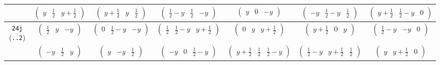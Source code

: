 \documentclass[fleqn,9pt,landscape]{jsarticle}
\begin{document}
\begin{center}
\begin{longtable}{ccccccc}
& $ \begin{pmatrix} y & \frac{1}{2} & y + \frac{1}{2} \end{pmatrix} $ & $ \begin{pmatrix} y + \frac{1}{2} & y & \frac{1}{2} \end{pmatrix} $ & $ \begin{pmatrix} \frac{1}{2} - y & \frac{1}{2} & - y \end{pmatrix} $ & $ \begin{pmatrix} y & 0 & - y \end{pmatrix} $ & $ \begin{pmatrix} - y & \frac{1}{2} - y & \frac{1}{2} \end{pmatrix} $ & $ \begin{pmatrix} y + \frac{1}{2} & \frac{1}{2} - y & 0 \end{pmatrix} $ \\ \hline
{\tt 24j} ({\tt ..2}) & $ \begin{pmatrix} \frac{1}{2} & y & - y \end{pmatrix} $ & $ \begin{pmatrix} 0 & \frac{1}{2} - y & - y \end{pmatrix} $ & $ \begin{pmatrix} \frac{1}{2} & \frac{1}{2} - y & y + \frac{1}{2} \end{pmatrix} $ & $ \begin{pmatrix} 0 & y & y + \frac{1}{2} \end{pmatrix} $ & $ \begin{pmatrix} y + \frac{1}{2} & 0 & y \end{pmatrix} $ & $ \begin{pmatrix} \frac{1}{2} - y & - y & 0 \end{pmatrix} $ \\
& $ \begin{pmatrix} - y & \frac{1}{2} & y \end{pmatrix} $ & $ \begin{pmatrix} y & - y & \frac{1}{2} \end{pmatrix} $ & $ \begin{pmatrix} - y & 0 & \frac{1}{2} - y \end{pmatrix} $ & $ \begin{pmatrix} y + \frac{1}{2} & \frac{1}{2} & \frac{1}{2} - y \end{pmatrix} $ & $ \begin{pmatrix} \frac{1}{2} - y & y + \frac{1}{2} & \frac{1}{2} \end{pmatrix} $ & $ \begin{pmatrix} y & y + \frac{1}{2} & 0 \end{pmatrix} $ \\

\end{longtable}
\end{center}
\end{document}
